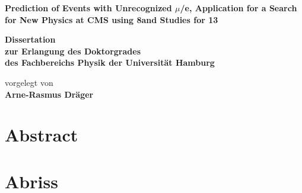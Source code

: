 \documentclass[
twoside=false,
headsepline,     %
headings=normal,
open=any,
numbers=noenddot, %
numbering %
]{scrreprt} %
\author{Arne-Rasmus Dr\"ager}
\begin{document}
\begin{titlepage}
  \begin{center}
    \thispagestyle{empty}
    \vspace*{1cm}
    \begin{doublespace} 
      \textbf{\huge
        Prediction of \wdecay Events with Unrecognized $\mu$/e, Application for a Search for New Physics at CMS using 8\tev and Studies for 13\tev}
      \vskip1.5cm
      \begin{Large} 
        \textbf{Dissertation\\
        zur Erlangung des Doktorgrades\\
        des Fachbereichs Physik
        der Universit\"{a}t Hamburg\\}
      \end{Large}
      \vskip2cm
      \begin{large}
        vorgelegt von\\
        {\bf Arne-Rasmus Dr\"{a}ger}
        \vfill
      \end{large}
    \end{doublespace} 
  \end{center}
\end{titlepage}

\newpage
\thispagestyle{empty}

\quad
\vfill
{}

\newpage
\thispagestyle{empty}
\section*{Abstract}

\clearpage
\section*{Abriss}

\newpage 
\thispagestyle{empty}
\quad 
\newpage
\end{document}
